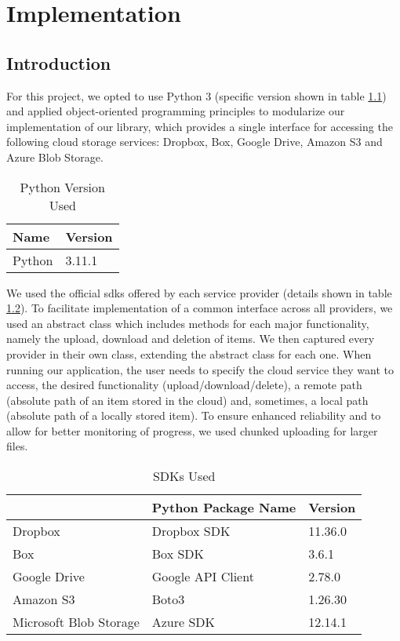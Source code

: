 \chapter{Implementation}

\section{Introduction}
For this project, we opted to use Python 3 (specific version shown in table \ref{tab:Python_Version}) and applied object-oriented programming principles to modularize our implementation of our library, which provides a single interface for accessing the following cloud storage services: Dropbox, Box, Google Drive, Amazon S3 and Azure Blob Storage. 


\begin{table}[!h]
	\centering
	\begin{tabular}{|l|l|}
		\hline
		\rowcolor[HTML]{EFEFEF} 
		\textbf{Name} & \textbf{Version} \\ \hline
		Python        & 3.11.1           \\ \hline
	\end{tabular}
	\caption{Python Version Used}
	\label{tab:Python_Version}
\end{table}

We used the official \ac{sdk}s offered by each service provider (details shown in table \ref{tab:SDKs}).  To facilitate implementation of a common interface across all providers, we used an abstract class which includes methods for each major functionality, namely the upload, download and deletion of items. We then captured every provider in their own class, extending the abstract class for each one. When running our application, the user needs to specify the cloud service they want to access, the desired functionality (upload/download/delete), a remote path (absolute path of an item stored in the cloud) and, sometimes, a local path (absolute path of a locally stored item). To ensure enhanced reliability and to allow for better monitoring of progress, we used chunked uploading for larger files. 


\begin{table}[!h]
	\centering
	\begin{tabular}{|l|l|l|}
		\hline
		\rowcolor[HTML]{EFEFEF} 
		\multicolumn{1}{|c|}{\cellcolor[HTML]{EFEFEF}\textbf{Cloud Storage Service}} &
		\multicolumn{1}{c|}{\cellcolor[HTML]{EFEFEF}\textbf{Python Package Name}} &
		{\color[HTML]{333333} \textbf{Version}} \\ \hline
		Dropbox                & Dropbox SDK       & 11.36.0 \\ \hline
		Box                    & Box SDK           & 3.6.1   \\ \hline
		Google Drive           & Google API Client & 2.78.0  \\ \hline
		Amazon S3              & Boto3             & 1.26.30 \\ \hline
		Microsoft Blob Storage & Azure SDK         & 12.14.1 \\ \hline
	\end{tabular}
	\caption{SDKs Used}
	\label{tab:SDKs}
\end{table}


